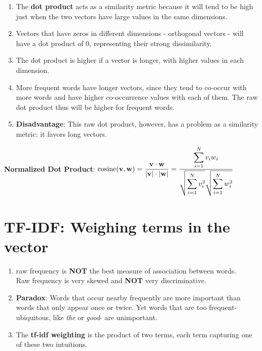 \begin{enumerate}
    \item The \textbf{dot product} acts as a similarity metric because it will tend to be high just when the two vectors have large values in the same dimensions. 
    
    \item Vectors that have zeros in different dimensions - orthogonal vectors - will have a dot product of 0, representing their strong dissimilarity.

    \item The dot product is higher if a vector is longer, with higher values in each dimension.
    
    \item More frequent words have longer vectors, since they tend to co-occur with more words and have higher co-occurrence values with each of them. The raw dot product thus will be higher for frequent words.

    \item \textbf{Disadvantage}: This raw dot product, however, has a problem as a similarity metric: it favors long vectors.

    
\end{enumerate}


\textbf{Normalized Dot Product}: \( \displaystyle \operatorname{cosine}(\mathbf{v,w}) = \dfrac{\mathbf{v\cdot w}}{|\mathbf{v}|\cdot|\mathbf{w}|} = \dfrac{\displaystyle\sum_{i=1}^{N} v_i w_i}{\displaystyle \sqrt{\sum_{i=1}^{N} v_i^2}\sqrt{\sum_{i=1}^{N} w_i^2}} \)


\section{TF-IDF: Weighing terms in the vector \cite{nlp-1}}\label{TF-IDF: concept}

\begin{enumerate}
    \item raw frequency is \textbf{NOT} the best measure of association between words.\\
    Raw frequency is very skewed and \textbf{NOT} very discriminative.

    \item \textbf{Paradox}: Words that occur nearby frequently are more important than words that only appear once or twice. Yet words that are too frequent-ubiquitous, like \textit{the} or \textit{good}- are unimportant.

    \item The \textbf{tf-idf weighting} is the product of two terms, each term capturing one of these two intuitions.
\end{enumerate}


